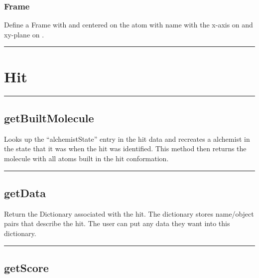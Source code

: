 \begin{itemize}
\subsubsection{Frame}

Define a Frame with  and centered on the atom with name 
with the x-axis on  and xy-plane on .


\rule{6in}{0.01cm}\par
{}\par
\section{Hit}
\rule{6in}{0.01cm}\par
{}\par
\subsection{getBuiltMolecule}

  Looks up the ``alchemistState'' entry in the hit data and recreates a alchemist in the state that it was when the hit was identified. This method then returns the molecule with all atoms built in the hit conformation.

\rule{6in}{0.01cm}\par
{}\par
\subsection{getData}

  Return the Dictionary associated with the hit. The dictionary stores name/object pairs that describe the hit. The user can put any data they want into this dictionary.

\rule{6in}{0.01cm}\par
{}\par
\subsection{getScore}


\end{itemize}
